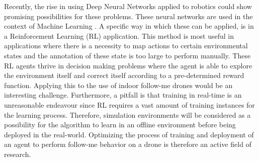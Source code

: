 Recently, the rise in using Deep Neural Networks applied to robotics could show 
promising possibilities for these problems. These neural 
networks are used in the context of Machine Learning \cite{neuralnets}.
A specific way in which these can be applied, is in a Reinforcement Learning (RL) 
application. This method is most useful in applications where there is a necessity 
to map actions to certain environmental states and the annotation of these state is 
too large to perform manually. These RL agents thrive in decision 
making problems where the agent is able to explore the environment itself and correct 
itself according to a pre-determined reward function. Applying this to the use of 
indoor follow-me drones would be an interesting challenge. Furthermore, a pitfall is that 
training in real-time is an unreasonable endeavour since RL requires a vast amount of 
training instances for the learning process. Therefore, simulation environments
will be considered as a possibility for the algorithm to learn in an offline environment 
before being deployed in the real-world. Optimizing the process of training and deployment of
an agent to perform follow-me behavior on a drone is therefore an active field of 
research. 